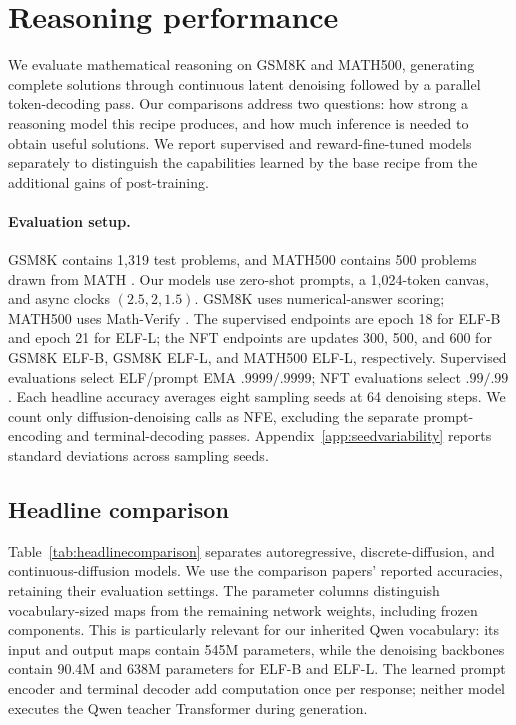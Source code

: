 \section{Reasoning performance}
\label{sec:headlineresults}

We evaluate mathematical reasoning on GSM8K and MATH500, generating complete solutions through continuous latent denoising followed by a parallel token-decoding pass. Our comparisons address two questions: how strong a reasoning model this recipe produces, and how much inference is needed to obtain useful solutions. We report supervised and reward-fine-tuned models separately to distinguish the capabilities learned by the base recipe from the additional gains of post-training.

\paragraph{Evaluation setup.}
GSM8K contains 1,319 test problems, and MATH500 contains 500 problems drawn from MATH \citep{gsm8k,math,math500}. Our models use zero-shot prompts, a 1,024-token canvas, and async clocks $(2.5,2,1.5)$. GSM8K uses numerical-answer scoring; MATH500 uses Math-Verify \citep{mathverify}. The supervised endpoints are epoch 18 for ELF-B and epoch 21 for ELF-L; the NFT endpoints are updates 300, 500, and 600 for GSM8K ELF-B, GSM8K ELF-L, and MATH500 ELF-L, respectively. Supervised evaluations select ELF/prompt EMA $.9999/.9999$; NFT evaluations select $.99/.99$. Each headline accuracy averages eight sampling seeds at 64 denoising steps. We count only diffusion-denoising calls as NFE, excluding the separate prompt-encoding and terminal-decoding passes. Appendix~\ref{app:seedvariability} reports standard deviations across sampling seeds.

\subsection{Headline comparison}
\label{sec:headlinecomparison}


Table~\ref{tab:headlinecomparison} separates autoregressive, discrete-diffusion, and continuous-diffusion models. We use the comparison papers' reported accuracies, retaining their evaluation settings. The parameter columns distinguish vocabulary-sized maps from the remaining network weights, including frozen components. This is particularly relevant for our inherited Qwen vocabulary: its input and output maps contain 545M parameters, while the denoising backbones contain 90.4M and 638M parameters for ELF-B and ELF-L. The learned prompt encoder and terminal decoder add computation once per response; neither model executes the Qwen teacher Transformer during generation.

